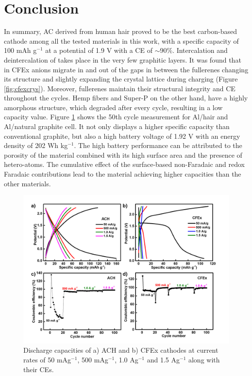 \documentclass{article}
\begin{document}
\newpage
\section{Conclusion}
In summary, AC derived from human hair proved to be the best carbon-based cathode among all the tested materials in this work, with a specific capacity of 100 mAh g$^{-1}$ at a potential of 1.9 V with a CE of $\sim$90$\%$. Intercalation and deintercalation of  takes place in the very few graphitic layers. It was found that in CFEx  anions migrate in and out of the gaps in between the fullerenes changing its structure and slightly expanding the crystal lattice during charging (Figure \ref{fig:cfexcrys}). Moreover, fullerenes maintain their structural integrity and CE throughout the cycles. Hemp fibers and Super-P on the other hand, have a highly amorphous structure, which degraded after every cycle, resulting in a low capacity value. Figure \ref{fig:CFExACHlong} shows the 50th cycle measurement for Al/hair and Al/natural graphite cell. It not only displays a higher specific capacity than conventional graphite, but also a high battery voltage of 1.92 V with an energy density of 202 Wh kg$^{-1}$. The high battery performance can be attributed to the porosity of the material combined with its high surface area and the presence of hetero-atoms. The cumulative effect of the surface-based non-Faradaic and redox Faradaic contributions lead to the material achieving higher capacities than the other materials.

\begin{figure}%
  \centering
  \includegraphics[width=\textwidth]{fig/CFExACHlong}
    \caption{Discharge capacities of a) ACH and b) CFEx cathodes at current rates of 50 mAg$^{-1}$, 500 mAg$^{-1}$, 1.0 Ag$^{-1}$ and 1.5 Ag$^{-1}$ along with their CEs. }
  \label{fig:CFExACHlong}
\end{figure}
\end{document}
